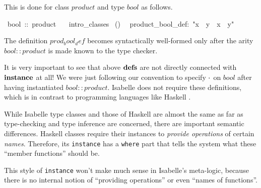 \begin{isabelle}
\begin{isamarkuptext}
 This is done for class $product$ and type $bool$ as follows.%
\end{isamarkuptext}%
~bool~::~product\isanewline
~~~intro\_classes\isanewline
{}~()\isanewline
~~product\_bool\_def:~{"}x~{\isasymOtimes}~y~{\isasymequiv}~x~{\isasymand}~y{"}%
\begin{isamarkuptext}%
The definition $prod_bool_def$ becomes syntactically well-formed only
 after the arity $bool :: product$ is made known to the type checker.

 \medskip It is very important to see that above ${\mathord{\mathbf{defs}}}$ are not
 directly connected with ${\mathord{\mathbf{instance}}}$ at all!  We were
 just following our convention to specify $\cdot$ on $bool$ after
 having instantiated $bool :: product$.  Isabelle does not require
 these definitions, which is in contrast to programming languages like
 Haskell \cite{haskell-report}.

 \medskip While Isabelle type classes and those of Haskell are almost
 the same as far as type-checking and type inference are concerned,
 there are important semantic differences.  Haskell classes require
 their instances to \emph{provide operations} of certain \emph{names}.
 Therefore, its \texttt{instance} has a \texttt{where} part that tells
 the system what these ``member functions'' should be.

 This style of \texttt{instance} won't make much sense in Isabelle's
 meta-logic, because there is no internal notion of ``providing
 operations'' or even ``names of functions''.%
\end{isamarkuptext}%
\end{isabelle}%
